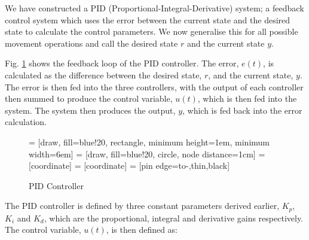 \documentclass[12pt]{article}
\begin{document}
We have constructed a PID (Proportional-Integral-Derivative) system; a feedback control system which uses the error between the current state and the desired state to calculate the control parameters. We now generalise this for all possible movement operations and call the desired state $r$ and the current state $y$.

Fig. \ref{fig:pid} shows the feedback loop of the PID controller. The error, $e(t)$, is calculated as the difference between the desired state, $r$, and the current state, $y$. The error is then fed into the three controllers, with the output of each controller then summed to produce the control variable, $u(t)$, which is then fed into the system. The system then produces the output, $y$, which is fed back into the error calculation.

\begin{figure}[ht]
    \centering
     = [draw, fill=blue!20, rectangle, 
    minimum height=1em, minimum width=6em]
     = [draw, fill=blue!20, circle, node distance=1cm]
     = [coordinate]
     = [coordinate]
     = [pin edge={to-,thin,black}]

    \caption{PID Controller}
    \label{fig:pid}
\end{figure}

The PID controller is defined by three constant parameters derived earlier, $K_p$, $K_i$ and $K_d$, which are the proportional, integral and derivative gains respectively. The control variable, $u(t)$, is then defined as:
\end{document}
